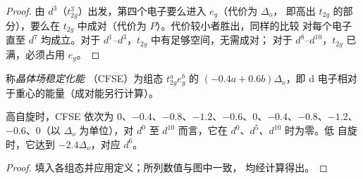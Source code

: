 \begin{proof}
由 $d^3$（$t_{2g}^3$）出发，第四个电子要么进入 $e_g$（代价为 $\Delta_o$，
即高出 $t_{2g}$ 的部分），要么在 $t_{2g}$ 中成对（代价为 $P$）。代价较小者胜出，同样的比较
对每个电子直至 $d^7$ 均成立。对于 $d^1$--$d^3$，$t_{2g}$ 中有足够空间，无需成对；
对于 $d^8$--$d^{10}$，$t_{2g}$ 已满，必须占用 $e_g$。
\end{proof}

\begin{definition}[晶体场稳定化能]\label{def:b2:ligand-field:cfse}
称\emph{晶体场稳定化能}
（CFSE）为组态 $t_{2g}^ae_g^b$ 的 $(-0.4a + 0.6b)\Delta_o$，即
d 电子相对于重心的能量（成对能另行计算）。
\end{definition}

\begin{proposition}[沿系列的晶体场稳定化能]\label{prop:b2:ligand-field:cfse}
高自旋时，CFSE 依次为 $0$、$-0.4$、$-0.8$、$-1.2$、$-0.6$、$0$、$-0.4$、$-0.8$、$-1.2$、
$-0.6$、$0$（以 $\Delta_o$ 为单位），对 $d^0$ 至 $d^{10}$ 而言，它在 $d^0$、$d^5$、$d^{10}$ 时为零。低
自旋时，它达到 $-2.4\Delta_o$，对应 $d^6$。
\end{proposition}

\begin{proof}
填入各组态并应用定义；所列数值与图中一致，
均经计算得出。
\end{proof}


